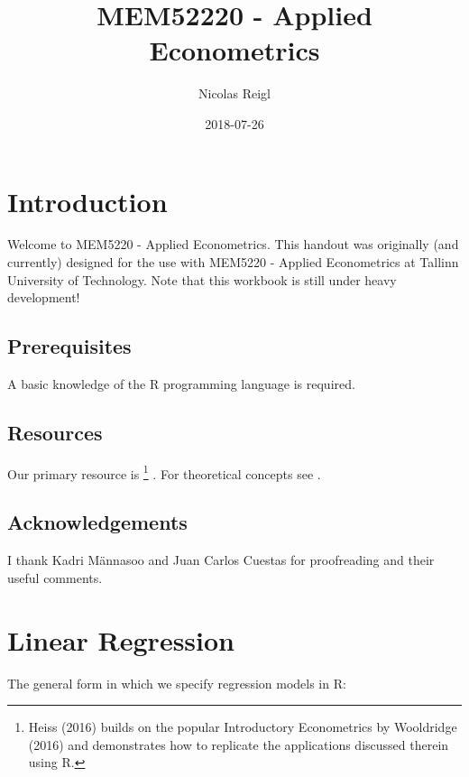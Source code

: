 \documentclass[]{book}
\title{MEM52220 - Applied Econometrics}
\author{Nicolas Reigl}
\date{2018-07-26}
\let\rmarkdownfootnote\footnote%
\def\footnote{\protect\rmarkdownfootnote}
\begin{document}
\maketitle

{
\setcounter{tocdepth}{1}
\tableofcontents
}
\hypertarget{introduction}{%
\chapter{Introduction}\label{introduction}}

Welcome to MEM5220 - Applied Econometrics. This handout was originally
(and currently) designed for the use with MEM5220 - Applied Econometrics
at Tallinn University of Technology. Note that this workbook is still
under heavy development!

\hypertarget{prerequisites}{%
\section{Prerequisites}\label{prerequisites}}

A basic knowledge of the R \citep{team2013r} programming language is
required.

\hypertarget{resources}{%
\section{Resources}\label{resources}}

Our primary resource is \citet{heiss2016using} \footnote{Heiss (2016)
  builds on the popular Introductory Econometrics by Wooldridge (2016)
  and demonstrates how to replicate the applications discussed therein
  using R.} . For theoretical concepts see
\citet{wooldridge2015introductory}.

\hypertarget{acknowledgements}{%
\section{Acknowledgements}\label{acknowledgements}}

I thank Kadri Männasoo and Juan Carlos Cuestas for proofreading and
their useful comments.

\hypertarget{linearregression}{%
\chapter{Linear Regression}\label{linearregression}}

The general form in which we specify regression models in R:
\end{document}
